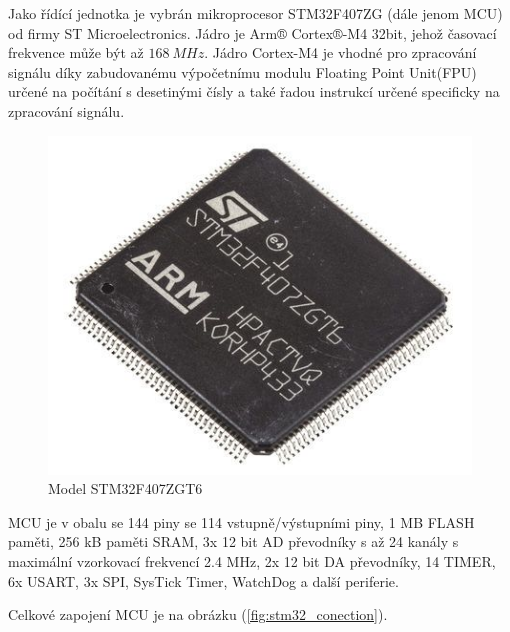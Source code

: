 Jako řídící jednotka je vybrán mikroprocesor STM32F407ZG (dále jenom MCU) od firmy ST Microelectronics.
Jádro je Arm® Cortex®-M4 32bit, jehož časovací frekvence může být až $168 \ MHz$. Jádro Cortex-M4 je vhodné pro zpracování signálu díky zabudovanému výpočetnímu modulu Floating Point Unit(FPU) určené na
počítání s desetinými čísly a také řadou instrukcí určené specificky na zpracování signálu.
\begin{figure}[H]
    \centering
    \includegraphics[width=0.5\linewidth]{pictures/stm32f407.jpg}
    \caption{Model STM32F407ZGT6 \cite{cite:STM32F407}}
    \label{fig:stm32}
\end{figure}
MCU je v obalu se 144 piny se 114 vstupně/výstupními piny, 1 MB FLASH paměti, 256 kB paměti SRAM, 3x 12 bit AD převodníky s až 24 kanály s maximální vzorkovací frekvencí 2.4 MHz,
2x 12 bit DA převodníky, 14 TIMER, 6x USART, 3x SPI, SysTick Timer, WatchDog a další periferie.
\par
Celkové zapojení MCU je na obrázku (\ref{fig:stm32_conection}).

